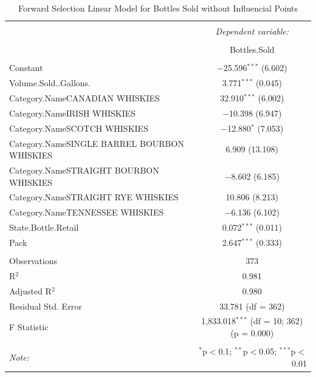 \documentclass[]{elsarticle} %
\begin{document}
\begin{table}[!htbp] \centering 
  \caption{Forward Selection Linear Model for Bottles Sold without Influencial Points} 
  \label{} 
\normalsize 
\begin{tabular}{@{\extracolsep{5pt}}lc} 
\\[-1.8ex]\hline 
\hline \\[-1.8ex] 
 & \multicolumn{1}{c}{\textit{Dependent variable:}} \\ 
\cline{2-2} 
\\[-1.8ex] & Bottles.Sold \\ 
\hline \\[-1.8ex] 
 Constant & $-$25.596$^{***}$ (6.602) \\ 
  Volume.Sold..Gallons. & 3.771$^{***}$ (0.045) \\ 
  Category.NameCANADIAN WHISKIES & 32.910$^{***}$ (6.002) \\ 
  Category.NameIRISH WHISKIES & $-$10.398 (6.947) \\ 
  Category.NameSCOTCH WHISKIES & $-$12.880$^{*}$ (7.053) \\ 
  Category.NameSINGLE BARREL BOURBON WHISKIES & 6.909 (13.108) \\ 
  Category.NameSTRAIGHT BOURBON WHISKIES & $-$8.602 (6.185) \\ 
  Category.NameSTRAIGHT RYE WHISKIES & 10.806 (8.213) \\ 
  Category.NameTENNESSEE WHISKIES & $-$6.136 (6.102) \\ 
  State.Bottle.Retail & 0.072$^{***}$ (0.011) \\ 
  Pack & 2.647$^{***}$ (0.333) \\ 
 \hline \\[-1.8ex] 
Observations & 373 \\ 
R$^{2}$ & 0.981 \\ 
Adjusted R$^{2}$ & 0.980 \\ 
Residual Std. Error & 33.781 (df = 362) \\ 
F Statistic & 1,833.018$^{***}$ (df = 10; 362)  (p = 0.000) \\ 
\hline 
\hline \\[-1.8ex] 
\textit{Note:}  & \multicolumn{1}{r}{$^{*}$p$<$0.1; $^{**}$p$<$0.05; $^{***}$p$<$0.01} \\ 
\end{tabular} 
\end{table}
\end{document}
